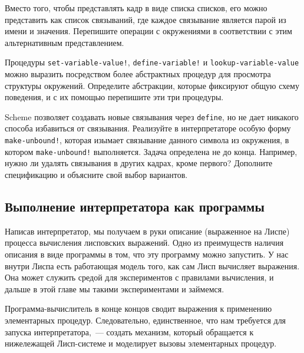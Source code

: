 \begin{exercise}{4.11}%
\label{EX4.11}%
Вместо того, чтобы представлять кадр в виде списка
списков, его можно представить как список связываний, где каждое
связывание является парой из имени и значения.  Перепишите операции с
окружениями в соответствии с этим альтернативным представлением.
\end{exercise}

\begin{exercise}{4.12}%
\label{EX4.12}%
Процедуры {\tt set-variable-value!},
{\tt define-variable!} и {\tt lookup-variable-va\-lue}
можно выразить посредством более абстрактных процедур для просмотра
структуры окружений.  Определите абстракции, которые фиксируют
общую схему поведения, и с их помощью перепишите эти три процедуры.
\end{exercise}

\begin{exercise}{4.13}%
\label{EX4.13}%
Scheme позволяет создавать новые связывания через
{\tt define}, но не дает никакого способа избавиться от
связывания.  Реализуйте в интерпретаторе особую форму
{\tt make-unbound!}, которая изымает связывание данного символа
из окружения, в котором {\tt make-unbound!} выполняется.
Задача определена не до конца.  Например, нужно ли удалять связывания
в других кадрах, кроме первого?  Дополните спецификацию и объясните
свой выбор вариантов.
\end{exercise}

\subsection{Выполнение интерпретатора как программы}
\label{RUNNING-THE-EVALUATOR-AS-A-PROGRAM}%

Написав интерпретатор, мы получаем в руки описание
(выраженное на Лиспе) процесса вычисления лисповских выражений.
Одно из преимуществ наличия описания в виде программы в том,
что эту программу можно запустить.  У нас внутри Лиспа есть работающая
модель того, как сам Лисп вычисляет выражения.  Она может служить
средой для экспериментов с правилами вычисления, и дальше в этой главе
мы такими экспериментами и займемся.

Программа-вычислитель в конце концов сводит выражения
к применению элементарных процедур.  Следовательно, 
единственное, что
нам требуется для запуска интерпретатора,~--- создать механизм,
который обращается к нижележащей Лисп-системе и моделирует вызовы
элементарных процедур.

